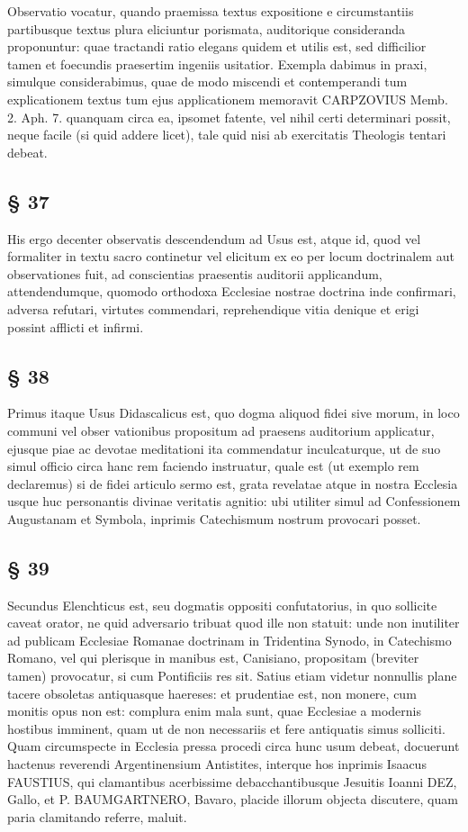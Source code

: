 Observatio vocatur, quando praemissa textus expositione e circumstantiis partibusque textus plura eliciuntur porismata, auditorique consideranda proponuntur: quae tractandi ratio elegans quidem et utilis est, sed difficilior tamen et foecundis praesertim ingeniis usitatior. Exempla dabimus in praxi, simulque considerabimus, quae de modo miscendi et contemperandi tum explicationem textus tum ejus applicationem memoravit CARPZOVIUS Memb. 2. Aph. 7. quanquam circa ea, ipsomet fatente, vel nihil certi determinari possit, neque facile (si quid addere licet), tale quid nisi ab exercitatis Theologis tentari debeat.

\subsection{§ 37}

His ergo decenter observatis descendendum ad Usus est, atque id, quod vel formaliter in textu sacro continetur vel elicitum ex eo per locum doctrinalem aut observationes fuit, ad conscientias praesentis auditorii applicandum, attendendumque, quomodo orthodoxa Ecclesiae nostrae doctrina inde confirmari, adversa refutari, virtutes commendari, reprehendique vitia denique et erigi possint afflicti et infirmi.

\subsection{§ 38}

Primus itaque Usus Didascalicus est, quo dogma aliquod fidei sive morum, in loco communi vel obser%
vationibus propositum ad praesens auditorium applicatur, ejusque piae ac devotae meditationi ita commendatur inculcaturque, ut de suo simul officio circa hanc rem faciendo instruatur, quale est (ut exemplo rem declaremus) si de fidei articulo sermo est, grata revelatae atque in nostra Ecclesia usque huc personantis divinae veritatis agnitio: ubi utiliter simul ad Confessionem Augustanam et Symbola, inprimis Catechismum nostrum provocari posset.

\subsection{§ 39}

Secundus Elenchticus est, seu dogmatis oppositi confutatorius, in quo sollicite caveat orator, ne quid adversario tribuat quod ille non statuit: unde non inutiliter ad publicam Ecclesiae Romanae doctrinam in Tridentina Synodo, in Catechismo Romano, vel qui plerisque in manibus est, Canisiano, propositam (breviter tamen) provocatur, si cum Pontificiis res sit. Satius etiam videtur nonnullis plane tacere obsoletas antiquasque haereses: et prudentiae est, non monere, cum monitis opus non est: complura enim mala sunt, quae Ecclesiae a modernis hostibus imminent, quam ut de non necessariis et fere antiquatis simus solliciti. Quam circumspecte in Ecclesia pressa procedi circa hunc usum debeat, docuerunt hactenus reverendi Argentinensium Antistites, interque hos inprimis Isaacus FAUSTIUS, qui clamantibus acerbissime debacchantibusque Jesuitis Ioanni DEZ, Gallo, et P. BAUMGARTNERO, Bavaro, placide illorum objecta discutere, quam paria clamitando referre, maluit.

